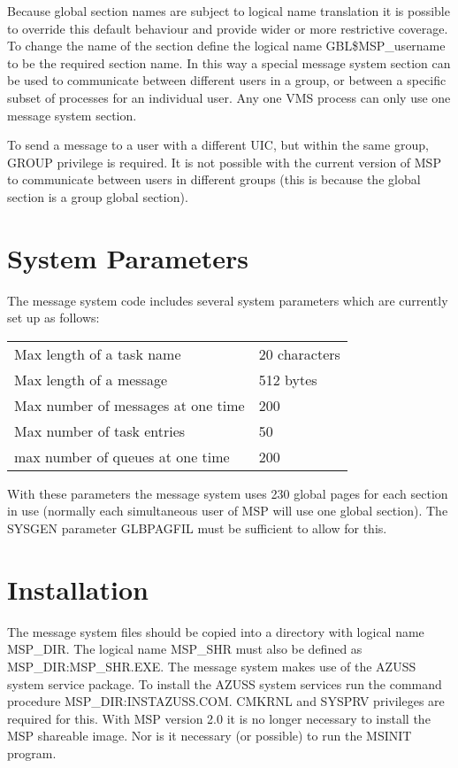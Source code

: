 Because global section names are subject to logical name translation it
is possible to override this default behaviour and provide wider or
more restrictive coverage. To change the name of the section define the
logical name GBL\$MSP\_username to be the required section name. In this way
a special message system section can be used to communicate between
different users in a group, or between a specific subset of processes for
an individual user. Any one VMS process can only use one message system
section.

To send a message to a user with a different UIC, but within the same group,
GROUP privilege is required. It is not possible with the current version
of MSP to communicate between users in different groups (this is because
the global section is a group global section).

\section{System Parameters}

The message system code includes several system parameters which are
currently set up as follows:

\begin{tabular}{|l|l|}  \hline
  Max length of a task name     &          20 characters   \\
  Max length of a message       &          512 bytes      \\
  Max number of messages at one time   &   200    \\
  Max number of task entries           &   50     \\
  max number of queues at one time     &   200     \\ \hline
\end{tabular}

With these parameters the message system uses 230 global pages for each
section in use (normally each simultaneous user of MSP will use one
global section). The SYSGEN parameter GLBPAGFIL must be sufficient to
allow for this.

\section{Installation}

The message system files should be copied into a directory with logical name
MSP\_DIR. The logical name MSP\_SHR must also be defined as
MSP\_DIR:MSP\_SHR.EXE. The message system makes use of the AZUSS system service
package. To install the AZUSS system services run the command procedure
MSP\_DIR:INSTAZUSS.COM. CMKRNL and SYSPRV privileges are required for this.
With MSP version 2.0 it is no longer necessary to install the MSP shareable
image. Nor is it necessary (or possible) to run the MSINIT program.

